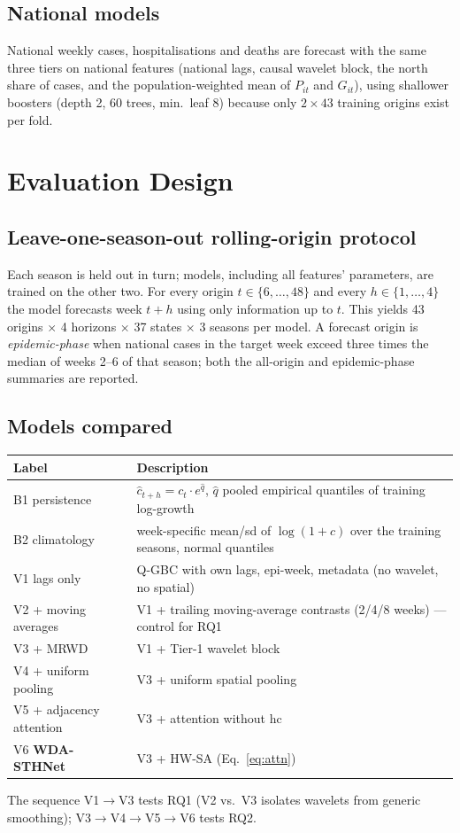 \documentclass[11pt,a4paper]{article}
\newcommand{\hc}{\mathrm{hc}}
\begin{document}
\subsection{National models}
National weekly cases, hospitalisations and deaths are forecast with the same three tiers on national features (national lags, causal wavelet block, the north share of cases, and the population-weighted mean of $P_{it}$ and $G_{it}$), using shallower boosters (depth 2, 60 trees, min.\ leaf 8) because only $2\times 43$ training origins exist per fold.

\section{Evaluation Design}\label{sec:eval}
\subsection{Leave-one-season-out rolling-origin protocol}
Each season is held out in turn; models, including all features' parameters, are trained on the other two. For every origin $t\in\{6,\dots,48\}$ and every $h\in\{1,\dots,4\}$ the model forecasts week $t+h$ using only information up to $t$. This yields 43 origins $\times$ 4 horizons $\times$ 37 states $\times$ 3 seasons per model. A forecast origin is \emph{epidemic-phase} when national cases in the target week exceed three times the median of weeks 2--6 of that season; both the all-origin and epidemic-phase summaries are reported.

\subsection{Models compared}
\begin{center}\small
\begin{tabular}{ll}
\toprule
Label & Description \\\midrule
B1 persistence & $\hat c_{t+h}=c_t\cdot e^{\hat q}$, $\hat q$ pooled empirical quantiles of training log-growth\\
B2 climatology & week-specific mean/sd of $\log(1+c)$ over the training seasons, normal quantiles\\
V1 lags only & Q-GBC with own lags, epi-week, metadata (no wavelet, no spatial)\\
V2 + moving averages & V1 + trailing moving-average contrasts (2/4/8 weeks) --- control for RQ1\\
V3 + MRWD & V1 + Tier-1 wavelet block\\
V4 + uniform pooling & V3 + uniform spatial pooling\\
V5 + adjacency attention & V3 + attention without $\hc$\\
V6 \textbf{WDA-STHNet} & V3 + HW-SA (Eq.~\eqref{eq:attn})\\\bottomrule
\end{tabular}
\end{center}
The sequence V1$\to$V3 tests RQ1 (V2 vs.\ V3 isolates wavelets from generic smoothing); V3$\to$V4$\to$V5$\to$V6 tests RQ2.
\end{document}
